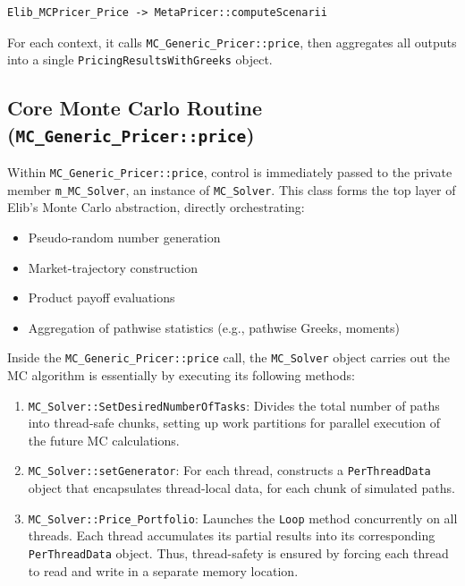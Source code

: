 \documentclass[11pt]{article}
\begin{document}
\begin{verbatim}
Elib_MCPricer_Price -> MetaPricer::computeScenarii
\end{verbatim}

For each context, it calls \texttt{MC\_Generic\_Pricer::price}, then aggregates all outputs into a single \texttt{PricingResultsWithGreeks} object.


\subsection{Core Monte Carlo Routine (\texttt{MC\_Generic\_Pricer::price})}

Within \texttt{MC\_Generic\_Pricer::price}, control is immediately passed to the private member \texttt{m\_MC\_Solver}, an instance of \texttt{MC\_Solver}.  This class forms the top layer of Elib’s Monte Carlo abstraction, directly orchestrating:

\begin{itemize}
  \item Pseudo-random number generation  
  \item Market-trajectory construction  
  \item Product payoff evaluations  
  \item Aggregation of pathwise statistics (e.g., pathwise Greeks, moments)  
\end{itemize}

Inside the \texttt{MC\_Generic\_Pricer::price} call, the \texttt{MC\_Solver} object carries out the MC algorithm is essentially by executing its following methods:

\begin{enumerate}
    \item \texttt{MC\_Solver::SetDesiredNumberOfTasks}: 
    Divides the total number of paths into thread-safe chunks, setting up work partitions for parallel execution of the future MC calculations.
        
    \item \texttt{MC\_Solver::setGenerator}: For each thread, constructs a \texttt{PerThreadData} object that encapsulates thread-local data, for each chunk of simulated paths.

    \item \texttt{MC\_Solver::Price\_Portfolio}: Launches the \texttt{Loop} method concurrently on all threads. Each thread accumulates its partial results into its corresponding \texttt{PerThreadData} object. Thus, thread-safety is ensured by forcing each thread to read and write in a separate memory location. 

\end{enumerate}
\end{document}
